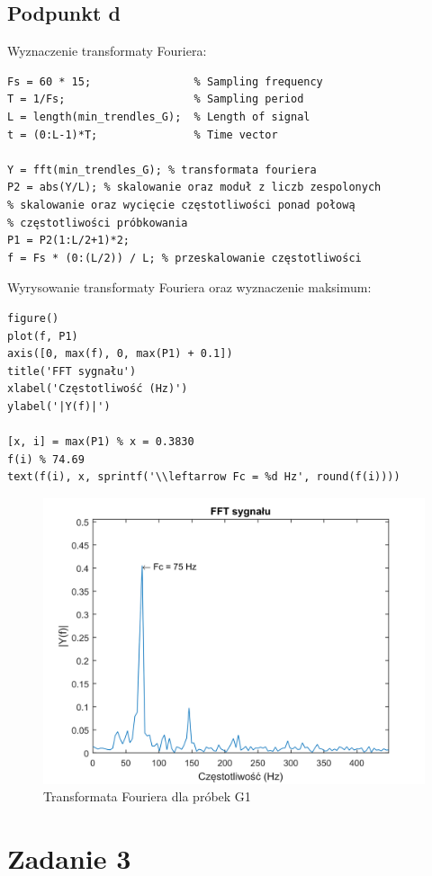 \documentclass[a4paper, 12pt, titlepage]{article}
\begin{document}
        \subsection{Podpunkt d}
            Wyznaczenie transformaty Fouriera:
\begin{lstlisting}
Fs = 60 * 15;                % Sampling frequency                    
T = 1/Fs;                    % Sampling period       
L = length(min_trendles_G);  % Length of signal
t = (0:L-1)*T;               % Time vector

Y = fft(min_trendles_G); % transformata fouriera
P2 = abs(Y/L); % skalowanie oraz moduł z liczb zespolonych
% skalowanie oraz wycięcie częstotliwości ponad połową 
% częstotliwości próbkowania
P1 = P2(1:L/2+1)*2; 
f = Fs * (0:(L/2)) / L; % przeskalowanie częstotliwości
\end{lstlisting}
        Wyrysowanie transformaty Fouriera oraz wyznaczenie maksimum:
\begin{lstlisting}
figure()
plot(f, P1)
axis([0, max(f), 0, max(P1) + 0.1])
title('FFT sygnału')
xlabel('Częstotliwość (Hz)')
ylabel('|Y(f)|')

[x, i] = max(P1) % x = 0.3830
f(i) % 74.69
text(f(i), x, sprintf('\\leftarrow Fc = %d Hz', round(f(i))))
\end{lstlisting}
            \begin{figure}[H]
                \centering
                \includegraphics[width=0.8\columnwidth]{FFT.png}
                \caption{Transformata Fouriera dla próbek G1}
            \end{figure}\noindent
    \section{Zadanie 3}
\end{document}
